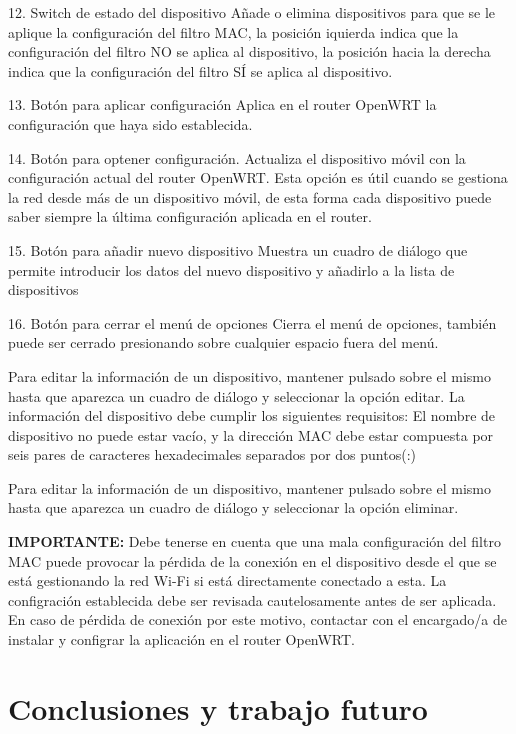 \documentclass{article}
\begin{document}
    12. Switch de estado del dispositivo
    Añade o elimina dispositivos para que se le aplique la configuración del filtro MAC, la posición iquierda indica que la configuración del filtro NO se aplica al dispositivo, la posición hacia la derecha indica que la configuración del filtro SÍ se aplica al dispositivo.

    13. Botón para aplicar configuración
    Aplica en el router OpenWRT la configuración que haya sido establecida.

    14. Botón para optener configuración.
    Actualiza el dispositivo móvil con la configuración actual del router OpenWRT. Esta opción es útil cuando se gestiona la red desde más de un dispositivo móvil, de esta forma cada dispositivo puede saber siempre la última configuración aplicada en el router.

    15. Botón para añadir nuevo dispositivo
    Muestra un cuadro de diálogo que permite introducir los datos del nuevo dispositivo y añadirlo a la lista de dispositivos

    16. Botón para cerrar el menú de opciones
    Cierra el menú de opciones, también puede ser cerrado presionando sobre cualquier espacio fuera del menú.

    Para editar la información de un dispositivo, mantener pulsado sobre el mismo hasta que aparezca un cuadro de diálogo y seleccionar la opción editar. La información del dispositivo debe cumplir los siguientes requisitos: El nombre de dispositivo no puede estar vacío, y la dirección MAC debe estar compuesta por seis pares de caracteres hexadecimales separados por dos puntos(:)

    Para editar la información de un dispositivo, mantener pulsado sobre el mismo hasta que aparezca un cuadro de diálogo y seleccionar la opción eliminar.

    \textbf{IMPORTANTE:} Debe tenerse en cuenta que una mala configuración del filtro MAC puede provocar la pérdida de la conexión en el dispositivo desde el que se está gestionando la red Wi-Fi si está directamente conectado a esta. La configración establecida debe ser revisada cautelosamente antes de ser aplicada. En caso de pérdida de conexión por este motivo, contactar con el encargado/a de instalar y configrar la aplicación en el router OpenWRT.

\section{Conclusiones y trabajo futuro}
\end{document}
